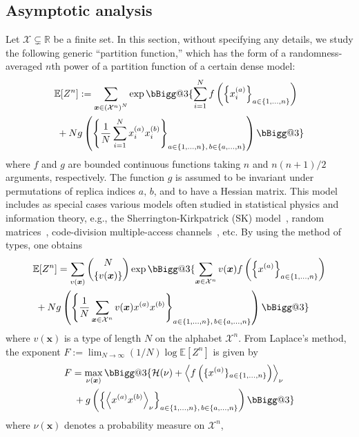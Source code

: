 \documentclass[conference,twocolumns]{IEEEtran}
\makeatletter
\newcommand{\vast}{\bBigg@{3}}
\theoremstyle{plain}
\makeatother
\begin{document}
\subsection{Asymptotic analysis}
Let $\mathcal{X}\subsetneq\mathbb{R}$ be a finite set.
In this section, without specifying any details, we study 
the following generic ``partition function,'' 
which has the form of a randomness-averaged $n$th power of 
a partition function of a certain dense model: 
\begin{align}
&\mathbb{E}[Z^n] := \sum_{\bm{x}\in\left(\mathcal{X}^n\right)^N} \exp\vast\{\sum_{i=1}^Nf\left(\left\{x_i^{(a)}\right\}_{a\in\{1,\dotsc,n\}}\right)\nonumber\\
&\;+ Ng\left(\left\{\frac1{N}\sum_{i=1}^Nx_{i}^{(a)}x_{i}^{(b)}\right\}_{a\in\{1,\dotsc,n\},\,b\in\{a,\dotsc,n\}}\right)\vast\}
\label{eq:dense}
\end{align}
where $f$ and $g$ are bounded continuous functions taking $n$ and $n(n+1)/2$ arguments, respectively.
The function $g$ is assumed to be invariant under permutations of replica indices $a,\,b$, and to have a Hessian matrix.
This model includes as special cases various models 
often studied in statistical physics and information theory,
e.g., the Sherrington-Kirkpatrick (SK) model~\cite{mezard2009ipa}, random matrices~\cite{edwards1976eigenvalue}, code-division multiple-access channels~\cite{tanaka2002statistical}, etc.
By using the method of types, one obtains~\cite{monasson1998optimization}
\begin{align*}
&\mathbb{E}[Z^n] = \sum_{v(\bm{x})} \binom{N}{\{v(\bm{x})\}}\exp\vast\{\sum_{\bm{x}\in\mathcal{X}^n}v(\bm{x})f\left(\left\{x^{(a)}\right\}_{a\in\{1,\dotsc,n\}}\right)\\
&\;+ Ng\left(\left\{\frac1{N}\sum_{\bm{x}\in\mathcal{X}^n}v(\bm{x})x^{(a)}x^{(b)}\right\}_{a\in\{1,\dotsc,n\},\,b\in\{a,\dotsc,n\}}\right)\vast\}
\end{align*}
where $v(\bm{x})$ is a type of length $N$ on the alphabet $\mathcal{X}^n$. 
From Laplace's method, 
the exponent $F:=\lim_{N\to\infty}(1/N)\log\mathbb{E}[Z^n]$ is given by 
\begin{align}
&F
= \max_{\nu(\bm{x})}\vast\{ \mathcal{H}(\nu)
+\left\langle f\left(\{x^{(a)}\}_{a\in\{1,\dotsc,n\}}\right)\right\rangle_\nu\nonumber\\
&\quad + g\left(\left\{\left\langle x^{(a)}x^{(b)}\right\rangle_\nu\right\}_{a\in\{1,\dotsc,n\},\,b\in\{a,\dotsc,n\}}\right)\vast\}
\label{eq:lap}
\end{align}
where $\nu(\bm{x})$ denotes a probability measure on $\mathcal{X}^n$,
\end{document}
